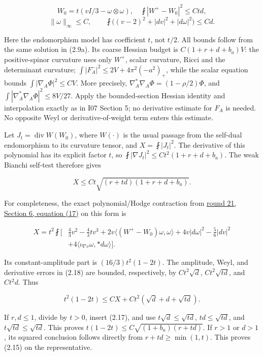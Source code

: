 \documentclass[
  10pt,
]{article}
\begin{document}
\[
 W_0=t(vI/3-\omega\otimes\omega),\quad
 \fint|W^+-W_0|^2\le Ctd,
\] \[
 \|\omega\|_\infty\le C,\qquad
 \fint\bigl((v-2)^2+|dv|^2+|d\omega|^2\bigr)\le Cd.
 \tag{2.16}
\]

Here the endomorphism model has coefficient \(t\), not \(t/2\). All
bounds follow from the same solution in (2.9a). Its coarse Hessian
budget is \(C(1+r+d+b_a)V\): the positive-spinor curvature uses only
\(W^+\), scalar curvature, Ricci and the determinant curvature;
\(\int|F_A^-|^2\le2V+4\pi^2(-a^2)_+\), while the scalar equation bounds
\(\int|\nabla_A\Phi|^2\le CV\). More precisely,
\(\nabla_A^*\nabla_A\Phi=(1-\rho/2)\Phi\), and
\(\int|\nabla_A^*\nabla_A\Phi|^2\le8V/27\). Apply the bounded-section
Hessian identity and interpolation exactly as in I07 Section 5; no
derivative estimate for \(F_A\) is needed. No opposite Weyl or
derivative-of-weight term enters this estimate.

Let \(J_t=\operatorname{div}W(W_0)\), where \(W(\cdot)\) is the usual
passage from the self-dual endomorphism to its curvature tensor, and
\(X=\fint|J_t|^2\). The derivative of this polynomial has its explicit
factor \(t\), so \(\fint|\nabla J_t|^2\le Ct^2(1+r+d+b_a)\). The weak
Bianchi self-test therefore gives

\[
 X\le Ct\sqrt{(r+td)(1+r+d+b_a)}.
 \tag{2.17}
\]

For completeness, the exact polynomial/Hodge contraction from
\href{../mathematics/current/round21_analytic.md}{round 21, Section 6,
equation (17)} on this form is

\[
\begin{aligned}
 X=t^2\fint\bigl[&\tfrac43v^2-\tfrac43t v^3
 +2v\langle(W^+-W_0)\omega,\omega\rangle
 +4v|d\omega|^2-\tfrac56|dv|^2\\
 &+4\langle\iota_{\nabla v}\omega,*d\omega\rangle\bigr].
\end{aligned}
 \tag{2.18}
\]

Its constant-amplitude part is \((16/3)t^2(1-2t)\). The amplitude, Weyl,
and derivative errors in (2.18) are bounded, respectively, by
\(Ct^2\sqrt d\), \(Ct^2\sqrt{td}\), and \(Ct^2d\). Thus

\[
 t^2(1-2t)\le CX+Ct^2(\sqrt d+d+\sqrt{td}).
 \tag{2.19}
\]

If \(r,d\le1\), divide by \(t>0\), insert (2.17), and use
\(t\sqrt d\le\sqrt{td}\), \(td\le\sqrt{td}\), and
\(t\sqrt{td}\le\sqrt{td}\). This proves
\(t(1-2t)\le C\sqrt{(1+b_a)(r+td)}\). If \(r>1\) or \(d>1\), its squared
conclusion follows directly from \(r+td\ge\min(1,t)\). This proves
(2.15) on the representative.
\end{document}
